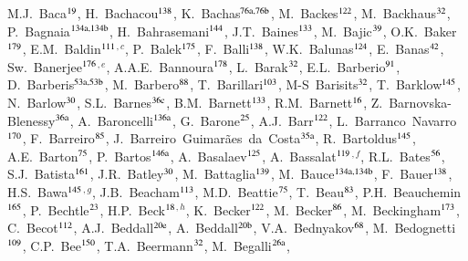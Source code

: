 \begin{flushleft}
M.J.~Baca$^\textrm{\scriptsize 19}$,
H.~Bachacou$^\textrm{\scriptsize 138}$,
K.~Bachas$^\textrm{\scriptsize 76a,76b}$,
M.~Backes$^\textrm{\scriptsize 122}$,
M.~Backhaus$^\textrm{\scriptsize 32}$,
P.~Bagnaia$^\textrm{\scriptsize 134a,134b}$,
H.~Bahrasemani$^\textrm{\scriptsize 144}$,
J.T.~Baines$^\textrm{\scriptsize 133}$,
M.~Bajic$^\textrm{\scriptsize 39}$,
O.K.~Baker$^\textrm{\scriptsize 179}$,
E.M.~Baldin$^\textrm{\scriptsize 111}$$^{,c}$,
P.~Balek$^\textrm{\scriptsize 175}$,
F.~Balli$^\textrm{\scriptsize 138}$,
W.K.~Balunas$^\textrm{\scriptsize 124}$,
E.~Banas$^\textrm{\scriptsize 42}$,
Sw.~Banerjee$^\textrm{\scriptsize 176}$$^{,e}$,
A.A.E.~Bannoura$^\textrm{\scriptsize 178}$,
L.~Barak$^\textrm{\scriptsize 32}$,
E.L.~Barberio$^\textrm{\scriptsize 91}$,
D.~Barberis$^\textrm{\scriptsize 53a,53b}$,
M.~Barbero$^\textrm{\scriptsize 88}$,
T.~Barillari$^\textrm{\scriptsize 103}$,
M-S~Barisits$^\textrm{\scriptsize 32}$,
T.~Barklow$^\textrm{\scriptsize 145}$,
N.~Barlow$^\textrm{\scriptsize 30}$,
S.L.~Barnes$^\textrm{\scriptsize 36c}$,
B.M.~Barnett$^\textrm{\scriptsize 133}$,
R.M.~Barnett$^\textrm{\scriptsize 16}$,
Z.~Barnovska-Blenessy$^\textrm{\scriptsize 36a}$,
A.~Baroncelli$^\textrm{\scriptsize 136a}$,
G.~Barone$^\textrm{\scriptsize 25}$,
A.J.~Barr$^\textrm{\scriptsize 122}$,
L.~Barranco~Navarro$^\textrm{\scriptsize 170}$,
F.~Barreiro$^\textrm{\scriptsize 85}$,
J.~Barreiro~Guimar\~{a}es~da~Costa$^\textrm{\scriptsize 35a}$,
R.~Bartoldus$^\textrm{\scriptsize 145}$,
A.E.~Barton$^\textrm{\scriptsize 75}$,
P.~Bartos$^\textrm{\scriptsize 146a}$,
A.~Basalaev$^\textrm{\scriptsize 125}$,
A.~Bassalat$^\textrm{\scriptsize 119}$$^{,f}$,
R.L.~Bates$^\textrm{\scriptsize 56}$,
S.J.~Batista$^\textrm{\scriptsize 161}$,
J.R.~Batley$^\textrm{\scriptsize 30}$,
M.~Battaglia$^\textrm{\scriptsize 139}$,
M.~Bauce$^\textrm{\scriptsize 134a,134b}$,
F.~Bauer$^\textrm{\scriptsize 138}$,
H.S.~Bawa$^\textrm{\scriptsize 145}$$^{,g}$,
J.B.~Beacham$^\textrm{\scriptsize 113}$,
M.D.~Beattie$^\textrm{\scriptsize 75}$,
T.~Beau$^\textrm{\scriptsize 83}$,
P.H.~Beauchemin$^\textrm{\scriptsize 165}$,
P.~Bechtle$^\textrm{\scriptsize 23}$,
H.P.~Beck$^\textrm{\scriptsize 18}$$^{,h}$,
K.~Becker$^\textrm{\scriptsize 122}$,
M.~Becker$^\textrm{\scriptsize 86}$,
M.~Beckingham$^\textrm{\scriptsize 173}$,
C.~Becot$^\textrm{\scriptsize 112}$,
A.J.~Beddall$^\textrm{\scriptsize 20e}$,
A.~Beddall$^\textrm{\scriptsize 20b}$,
V.A.~Bednyakov$^\textrm{\scriptsize 68}$,
M.~Bedognetti$^\textrm{\scriptsize 109}$,
C.P.~Bee$^\textrm{\scriptsize 150}$,
T.A.~Beermann$^\textrm{\scriptsize 32}$,
M.~Begalli$^\textrm{\scriptsize 26a}$,
$$
\end{flushleft}
